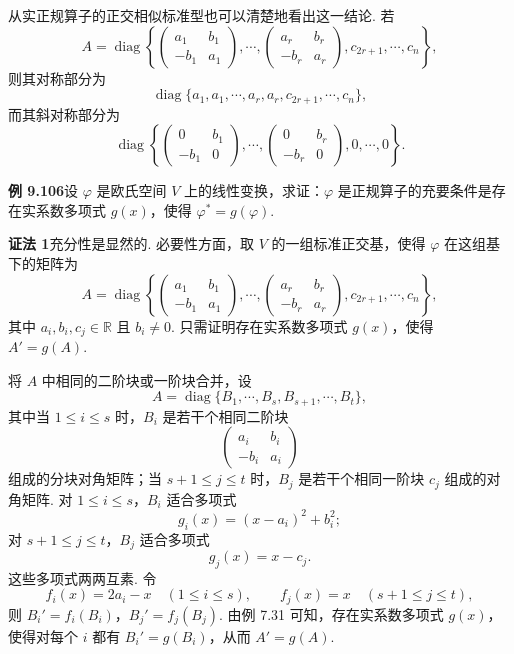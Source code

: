 \documentclass[UTF8,12pt,a4paper,fontset=fandol]{ctexart}
\begin{document}
从实正规算子的正交相似标准型也可以清楚地看出这一结论. 若
\[
A=\operatorname{diag}\left\{
\begin{pmatrix}
a_1&b_1\\
-b_1&a_1
\end{pmatrix},\cdots,
\begin{pmatrix}
a_r&b_r\\
-b_r&a_r
\end{pmatrix},
c_{2r+1},\cdots,c_n
\right\},
\]
则其对称部分为
\[
\operatorname{diag}\{a_1,a_1,\cdots,a_r,a_r,c_{2r+1},\cdots,c_n\},
\]
而其斜对称部分为
\[
\operatorname{diag}\left\{
\begin{pmatrix}
0&b_1\\
-b_1&0
\end{pmatrix},\cdots,
\begin{pmatrix}
0&b_r\\
-b_r&0
\end{pmatrix},
0,\cdots,0
\right\}.
\]

\noindent\textbf{例 9.106}\quad 设 $\varphi$ 是欧氏空间 $V$ 上的线性变换，求证：$\varphi$ 是正规算子的充要条件是存在实系数多项式 $g(x)$，使得 $\varphi^*=g(\varphi)$.

\noindent\textbf{证法 1}\quad 充分性是显然的. 必要性方面，取 $V$ 的一组标准正交基，使得 $\varphi$ 在这组基下的矩阵为
\[
A=\operatorname{diag}\left\{
\begin{pmatrix}
a_1&b_1\\
-b_1&a_1
\end{pmatrix},\cdots,
\begin{pmatrix}
a_r&b_r\\
-b_r&a_r
\end{pmatrix},
c_{2r+1},\cdots,c_n
\right\},
\]
其中 $a_i,b_i,c_j\in\mathbb{R}$ 且 $b_i\ne0$. 只需证明存在实系数多项式 $g(x)$，使得 $A'=g(A)$.

将 $A$ 中相同的二阶块或一阶块合并，设
\[
A=\operatorname{diag}\{B_1,\cdots,B_s,B_{s+1},\cdots,B_t\},
\]
其中当 $1\le i\le s$ 时，$B_i$ 是若干个相同二阶块
\[
\begin{pmatrix}
a_i&b_i\\
-b_i&a_i
\end{pmatrix}
\]
组成的分块对角矩阵；当 $s+1\le j\le t$ 时，$B_j$ 是若干个相同一阶块 $c_j$ 组成的对角矩阵. 对 $1\le i\le s$，$B_i$ 适合多项式
\[
g_i(x)=(x-a_i)^2+b_i^2;
\]
对 $s+1\le j\le t$，$B_j$ 适合多项式
\[
g_j(x)=x-c_j.
\]
这些多项式两两互素. 令
\[
f_i(x)=2a_i-x\quad (1\le i\le s),\qquad f_j(x)=x\quad (s+1\le j\le t),
\]
则 $B_i'=f_i(B_i)$，$B_j'=f_j(B_j)$. 由例 7.31 可知，存在实系数多项式 $g(x)$，使得对每个 $i$ 都有 $B_i'=g(B_i)$，从而 $A'=g(A)$.
\end{document}
